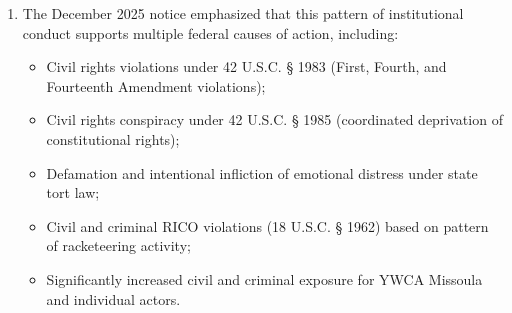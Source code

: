 \documentclass[12pt,letterpaper]{article}
\begin{document}
\begin{enumerate}
\begin{itemize}
\item How E'Lise recruited subordinate YWCA staffer Rebecca Pettit and YWCA liaison Officer Ethan Smith into the false narrative;

\item How this YWCA-coordinated campaign drove repeated, baseless arrests and harassment of myself and my family members;

\item How E'Lise allegedly recruited YWCA client Tyleen Root to conduct targeted online harassment and defamation campaigns against my business and customers;

\item How Missoula PD refused to intervene when I attempted to provide evidence of this harassment, and instead intimidated me---demonstrating a joint state-private conspiracy;

\item How YWCA ignored my 2018 formal complaint and a separate character-witness email about E'Lise's conduct;

\item How YWCA's institutional indifference destroyed my ability to continue sheltering vulnerable women I had been helping through my personal resources and network.
\end{itemize}

\item The December 2025 notice emphasized that this pattern of institutional conduct supports multiple federal causes of action, including:

\begin{itemize}
\item Civil rights violations under 42 U.S.C. \S{} 1983 (First, Fourth, and Fourteenth Amendment violations);

\item Civil rights conspiracy under 42 U.S.C. \S{} 1985 (coordinated deprivation of constitutional rights);

\item Defamation and intentional infliction of emotional distress under state tort law;

\item Civil and criminal RICO violations (18 U.S.C. \S{} 1962) based on pattern of racketeering activity;

\item Significantly increased civil and criminal exposure for YWCA Missoula and individual actors.
\end{itemize}


\end{enumerate}
\end{document}
